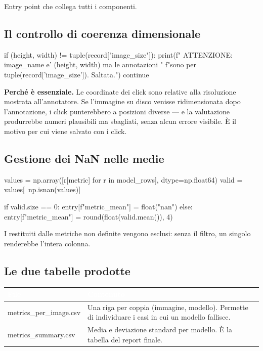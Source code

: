 Entry point che collega tutti i componenti.

\subsection{Il controllo di coerenza dimensionale}

\begin{idebox}
\begin{pycode}
if (height, width) != tuple(record["image_size"]):
    print(f"  ATTENZIONE: {image_name} e' {(height, width)} ma le annotazioni "
          f"sono per {tuple(record['image_size'])}. Saltata.")
    continue
\end{pycode}
\end{idebox}

\begin{attenzione}
\textbf{Perché è essenziale.} Le coordinate dei click sono relative alla risoluzione mostrata
all'annotatore. Se l'immagine su disco venisse ridimensionata dopo l'annotazione, i click
punterebbero a posizioni diverse --- e la valutazione produrrebbe numeri plausibili ma sbagliati,
senza alcun errore visibile. È il motivo per cui  viene salvato con i click.
\end{attenzione}

\subsection{Gestione dei NaN nelle medie}

\begin{idebox}
\begin{pycode}
values = np.array([r[metric] for r in model_rows], dtype=np.float64)
valid = values[~np.isnan(values)]

if valid.size == 0:
    entry[f"{metric}_mean"] = float("nan")
else:
    entry[f"{metric}_mean"] = round(float(valid.mean()), 4)
\end{pycode}
\end{idebox}

I  restituiti dalle metriche non definite vengono esclusi: senza il filtro, un singolo
 renderebbe  l'intera colonna.

\subsection{Le due tabelle prodotte}

\begin{center}
\begin{tabular}{>{\ttfamily}l p{8.2cm}}
\toprule
\rowcolor{tblHead}\textcolor{white}{\textbf{File}} & \textcolor{white}{\textbf{Contenuto}} \\
\midrule
metrics\_per\_image.csv & Una riga per coppia (immagine, modello). Permette di individuare i casi
in cui un modello fallisce. \\
\rowcolor{tblAlt} metrics\_summary.csv & Media e deviazione standard per modello. È la tabella del
report finale. \\
\bottomrule
\end{tabular}
\end{center}

